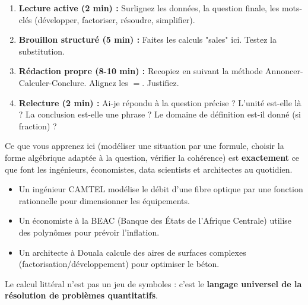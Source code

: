 \documentclass[11pt]{article}
\begin{document}
\begin{methode}
\begin{enumerate}
    \item \textbf{Lecture active (2 min) :} Surlignez les données, la question finale, les mots-clés (\og{}développer\fg{}, \og{}factoriser\fg{}, \og{}résoudre\fg{}, \og{}simplifier\fg{}).
    \item \textbf{Brouillon structuré (5 min) :} Faites les calculs "sales" ici. Testez la substitution.
    \item \textbf{Rédaction propre (8-10 min) :} Recopiez en suivant la méthode \og{}Annoncer-Calculer-Conclure\fg{}. Alignez les $=$. Justifiez.
    \item \textbf{Relecture (2 min) :} Ai-je répondu à la question précise ? L'unité est-elle là ? La conclusion est-elle une phrase ? Le domaine de définition est-il donné (si fraction) ?
\end{enumerate}
\end{methode}

\begin{savaistu}
Ce que vous apprenez ici (modéliser une situation par une formule, choisir la forme algébrique adaptée à la question, vérifier la cohérence) est \textbf{exactement} ce que font les ingénieurs, économistes, data scientists et architectes au quotidien.
\begin{itemize}
    \item Un ingénieur CAMTEL modélise le débit d'une fibre optique par une fonction rationnelle pour dimensionner les équipements.
    \item Un économiste à la BEAC (Banque des États de l'Afrique Centrale) utilise des polynômes pour prévoir l'inflation.
    \item Un architecte à Douala calcule des aires de surfaces complexes (factorisation/développement) pour optimiser le béton.
\end{itemize}
Le calcul littéral n'est pas un jeu de symboles : c'est le \textbf{langage universel de la résolution de problèmes quantitatifs}.
\end{savaistu}
\end{document}
